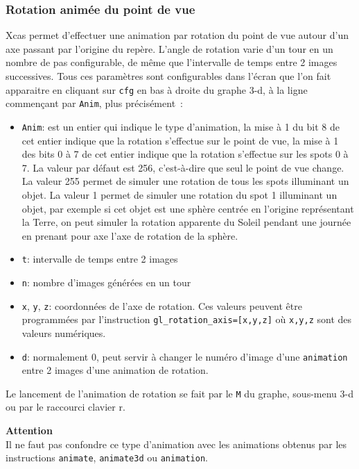 \documentclass[a4paper,11pt]{article}
\begin{document}
\subsubsection{Rotation anim\'ee du point de vue} \label{sec:anim3d}
Xcas permet d'effectuer une animation par rotation du point de vue
autour d'un axe passant par l'origine du rep\`ere. L'angle de rotation varie
d'un tour en un nombre de pas configurable, de m\^eme que l'intervalle
de temps entre 2 images successives. Tous ces param\`etres sont
configurables dans l'\'ecran que l'on fait apparaitre en
cliquant sur \verb|cfg| en bas \`a droite du graphe 3-d, \`a la ligne
commen\c{c}ant par \verb|Anim|, plus pr\'ecis\'ement~:
\begin{itemize}
\item \verb|Anim|: est un entier qui indique le type d'animation,
la mise \`a 1 du bit 8 de cet entier indique que la rotation s'effectue sur
le point de vue, la mise \`a 1 des bits 0 \`a 7 de cet entier 
indique que la rotation s'effectue
sur les spots 0 \`a 7. La valeur par d\'efaut est 256, c'est-\`a-dire que
seul le point de vue change. La valeur 255 permet de simuler
une rotation de tous les spots illuminant un objet. La valeur 1
permet de simuler une rotation du spot 1 illuminant un objet, par
exemple si cet objet est une sph\`ere centr\'ee en l'origine
repr\'esentant la Terre, 
on peut simuler la rotation apparente du Soleil 
pendant une journ\'ee en prenant pour axe l'axe de rotation de la sph\`ere.
\item \verb|t|: intervalle de temps entre 2 images
\item \verb|n|: nombre d'images g\'en\'er\'ees en un tour
\item %
\verb|x|, \verb|y|, \verb|z|: coordonn\'ees de l'axe de rotation.
Ces valeurs peuvent \^etre programm\'ees par l'instruction
\verb|gl_rotation_axis=[x,y,z]| o\`u \verb|x,y,z| sont
des valeurs num\'eriques.
\item \verb|d|: normalement 0, peut servir \`a changer le num\'ero
d'image d'une \verb|animation| entre 2 images d'une animation 
de rotation.
\end{itemize}
Le lancement de l'animation de rotation se fait par le \verb|M|
du graphe, sous-menu 3-d ou par le raccourci clavier r.

{\bf Attention}\\
Il ne faut pas confondre ce type d'animation avec les animations
obtenus par les instructions \verb|animate|, \verb|animate3d|
ou \verb|animation|.
\end{document}
